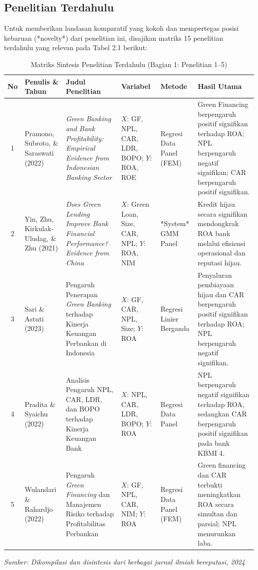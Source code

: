 \documentclass[12pt,a4paper]{article}
\numberwithin{equation}{section}
\begin{document}
\subsection{Penelitian Terdahulu}

\noindent
Untuk memberikan landasan komparatif yang kokoh dan mempertegas posisi kebaruan (*novelty*) dari penelitian ini, disajikan matriks 15 penelitian terdahulu yang relevan pada Tabel 2.1 berikut:

\vspace{0.3cm}
\begin{table}[H]
  \caption{Matriks Sintesis Penelitian Terdahulu (Bagian 1: Penelitian 1--5)}
  \label{tab:penelitian_terdahulu_a}
  \footnotesize
  \begin{tabularx}{\textwidth}{|c|>{\raggedright\arraybackslash}p{2.3cm}|>{\raggedright\arraybackslash}X|>{\raggedright\arraybackslash}p{1.9cm}|>{\raggedright\arraybackslash}p{1.8cm}|>{\raggedright\arraybackslash}X|}
    \hline
    \textbf{No} & \textbf{Penulis \& Tahun} & \textbf{Judul Penelitian} & \textbf{Variabel} & \textbf{Metode} & \textbf{Hasil Utama} \\
    \hline
    1 & Pramono, Subroto, \& Saraswati (2022) & \emph{Green Banking and Bank Profitability: Empirical Evidence from Indonesian Banking Sector} & $X$: GF, NPL, CAR, LDR, BOPO; $Y$: ROA, ROE & Regresi Data Panel (FEM) & Green Financing berpengaruh positif signifikan terhadap ROA; NPL berpengaruh negatif signifikan; CAR berpengaruh positif signifikan. \\
    \hline
    2 & Yin, Zhu, Kirkulak-Uludag, \& Zhu (2021) & \emph{Does Green Lending Improve Bank Financial Performance? Evidence from China} & $X$: Green Loan, Size, CAR, NPL; $Y$: ROA, NIM & *System* GMM Panel & Kredit hijau secara signifikan mendongkrak ROA bank melalui efisiensi operasional dan reputasi hijau. \\
    \hline
    3 & Sari \& Astuti (2023) & Pengaruh Penerapan \emph{Green Banking} terhadap Kinerja Keuangan Perbankan di Indonesia & $X$: GF, CAR, NPL, Size; $Y$: ROA & Regresi Linier Berganda & Penyaluran pembiayaan hijau dan CAR berpengaruh positif signifikan terhadap ROA; NPL berpengaruh negatif signifikan. \\
    \hline
    4 & Pradita \& Syaichu (2022) & Analisis Pengaruh NPL, CAR, LDR, dan BOPO terhadap Kinerja Keuangan Bank & $X$: NPL, CAR, LDR, BOPO; $Y$: ROA & Regresi Data Panel & NPL berpengaruh negatif signifikan terhadap ROA, sedangkan CAR berpengaruh positif signifikan pada bank KBMI 4. \\
    \hline
    5 & Wulandari \& Rahardjo (2022) & Pengaruh \emph{Green Financing} dan Manajemen Risiko terhadap Profitabilitas Perbankan & $X$: GF, NPL, CAR, NIM; $Y$: ROA & Regresi Data Panel (FEM) & Green financing dan CAR terbukti meningkatkan ROA secara simultan dan parsial; NPL menurunkan laba. \\
    \hline
  \end{tabularx}
  \begin{flushleft}
    \textit{Sumber: Dikompilasi dan disintesis dari berbagai jurnal ilmiah bereputasi, 2024}
  \end{flushleft}
\end{table}
\end{document}
